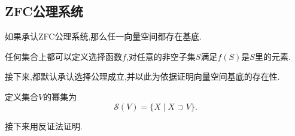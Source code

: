 \subsection{ZFC公理系统}
\begin{proposition}[][prop:1.3.3]
如果承认ZFC公理系统,那么任一向量空间都存在基底.
\end{proposition}
\begin{axiom}
任何集合上都可以定义选择函数$f$,对任意的非空子集$S$满足$f(S)$是$S$里的元素.
\end{axiom}
接下来,都默认承认选择公理成立,并以此为依据证明向量空间基底的存在性.
\begin{axiom}
定义集合$V$的幂集为
\begin{equation}
  \label{def: 幂集}
  \mathscr{S}(V)=\{X\mid X\supset V\}.
\end{equation}
\end{axiom}
接下来用反证法证明.
